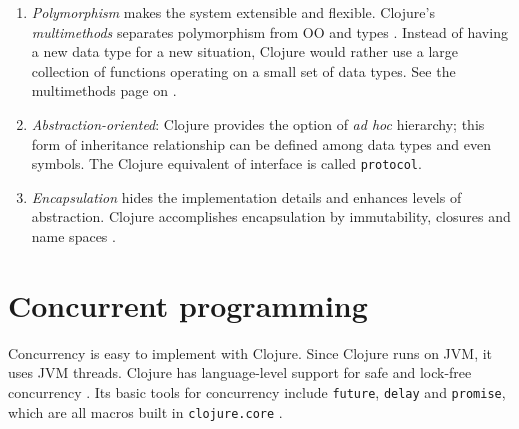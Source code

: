 \documentclass[12pt]{article}
\begin{document}
\begin{enumerate}
\item { \it Polymorphism} makes the system extensible and flexible. Clojure's {\it multimethods} separates polymorphism from OO and types \cite{clojurerationale}. Instead of having a new data type for a new situation, Clojure would rather use a large collection of functions operating on a small set of data types. See the multimethods page on \cite{hickey2009clojure}.



\item {\it Abstraction-oriented}: Clojure provides the option of {\it ad hoc} hierarchy; this form of inheritance relationship can be defined among data types and even symbols. The Clojure equivalent of interface is called \texttt{protocol}.





\item {\it Encapsulation} hides the implementation details and enhances levels of abstraction. Clojure accomplishes encapsulation by immutability, closures and name spaces \cite{relevance}.



\end{enumerate}




\part{Concurrent programming}

Concurrency is easy to implement with Clojure. Since Clojure runs on JVM, it uses JVM threads. Clojure has language-level support for safe and lock-free concurrency \cite{rathore2011clojure}.
Its basic tools for concurrency include \texttt{future}, \texttt{delay} and \texttt{promise}, which are all macros built in \texttt{clojure.core} \cite{brave2015concur}.
\end{document}
